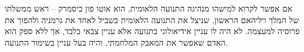 \documentclass[]{article}
\begin{document}
	אם אפשר לקרוא למישהו מנהיגה התנועה הלאומית, הוא אוטו פון ביסמרק – ראש ממשלתו של המלך ויליהאם הראשון, שניצל את התנועה הלאומית בשביל לאחד את גרמניה ולהפוך את פרוסיה למעצמה. לא היה לו עניין אידיאולוגי בתנועה אלא עניין צבאי בלבד, אך ללא ספק הוא האדם שאפשר את המאבק המלחמתי, והיה בעל עניין בשימור התנועה. 
\end{document}
